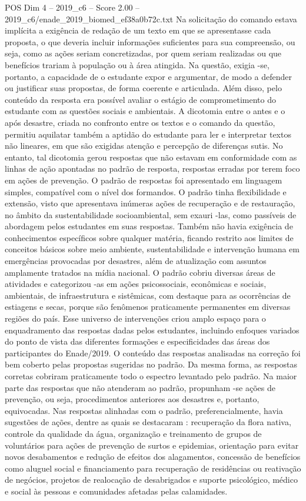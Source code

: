 \begin{textsample}{POS Dim 4 – 2019\_c6 – Score 2.00 – 2019\_c6/enade\_2019\_biomed\_ef38a0b72c.txt}
Na solicitação do comando estava implícita a exigência de redação de um texto em que se apresentasse cada proposta, o que deveria incluir informações suficientes para sua compreensão, ou seja, como as ações seriam concretizadas, por quem seriam realizadas ou que benefícios trariam à população ou à área atingida.
Na questão, exigia -se, portanto, a capacidade de o estudante expor e argumentar, de modo a defender ou justificar suas propostas, de forma coerente e articulada.
Além disso, pelo conteúdo da resposta era possível avaliar o estágio de comprometimento do estudante com as questões sociais e ambientais.
A dicotomia entre o antes e o após desastre, criada no confronto entre os textos e o comando da questão, permitiu aquilatar também a aptidão do estudante para ler e interpretar textos não lineares, em que são exigidas atenção e percepção de diferenças sutis.
No entanto, tal dicotomia gerou respostas que não estavam em conformidade com as linhas de ação apontadas no padrão de resposta, respostas erradas por terem foco em ações de prevenção.
O padrão de respostas foi apresentado em linguagem simples, compatível com o nível dos formandos.
O padrão tinha flexibilidade e extensão, visto que apresentava inúmeras ações de recuperação e de restauração, no âmbito da sustentabilidade socioambiental, sem exauri -las, como passíveis de abordagem pelos estudantes em suas respostas.
Também não havia exigência de conhecimentos específicos sobre qualquer matéria, ficando restrito aos limites de conceitos básicos sobre meio ambiente, sustentabilidade e intervenção humana em emergências provocadas por desastres, além de atualização com assuntos amplamente tratados na mídia nacional.
O padrão cobriu diversas áreas de atividades e categorizou -as em ações psicossociais, econômicas e sociais, ambientais, de infraestrutura e sistêmicas, com destaque para as ocorrências de estiagens e secas, porque são fenômenos praticamente permanentes em diversas regiões do país.
Esse universo de intervenções criou amplo espaço para o enquadramento das respostas dadas pelos estudantes, incluindo enfoques variados do ponto de vista das diferentes formações e especificidades das áreas dos participantes do Enade/2019.
O conteúdo das respostas analisadas na correção foi bem coberto pelas propostas sugeridas no padrão.
Da mesma forma, as respostas corretas cobriram praticamente todo o espectro levantado pelo padrão.
Na maior parte das respostas que não atenderam ao padrão, propunham -se ações de prevenção, ou seja, procedimentos anteriores aos desastres e, portanto, equivocadas.
Nas respostas alinhadas com o padrão, preferencialmente, havia sugestões de ações, dentre as quais se destacaram : recuperação da flora nativa, controle da qualidade da água, organização e treinamento de grupos de voluntários para ações de prevenção de surtos e epidemias, orientação para evitar novos desabamentos e redução de efeitos dos alagamentos, concessão de benefícios como aluguel social e financiamento para recuperação de residências ou reativação de negócios, projetos de realocação de desabrigados e suporte psicológico, médico e social às pessoas e comunidades afetadas pelas calamidades.

\end{textsample}
